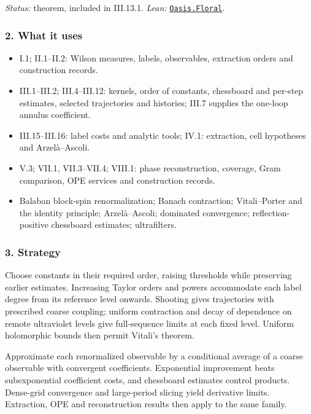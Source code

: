 \documentclass[
  letterpaper,
  11pt]{article}
\providecommand{\tightlist}{%
  \setlength{\itemsep}{0pt}\setlength{\parskip}{0pt}}
\begin{document}
\emph{Status:} theorem, included in III.13.1. \emph{Lean:}
\href{https://github.com/yang-mills-group/OpenAI-YM-20261028/blob/3456e5e75cf8d4cd558955a5c7638fba2d68f464/YM/UVExtension/Oasis/Flora.lean\#L55-L71}{\texttt{Oasis.Floral}}.

\subsubsection{2. What it uses}\label{what-it-uses-15}

\begin{itemize}
\tightlist
\item
  I.1; II.1--II.2: Wilson measures, labels, observables, extraction
  orders and construction records.
\item
  III.1--III.2; III.4--III.12: kernels, order of constants, chessboard
  and per-step estimates, selected trajectories and histories; III.7
  supplies the one-loop annulus coefficient.
\item
  III.15--III.16: label costs and analytic tools; IV.1: extraction, cell
  hypotheses and Arzelà--Ascoli.
\item
  V.3; VII.1, VII.3--VII.4; VIII.1: phase reconstruction, coverage, Gram
  comparison, OPE services and construction records.
\item
  Balaban block-spin renormalization; Banach contraction; Vitali--Porter
  and the identity principle; Arzelà--Ascoli; dominated convergence;
  reflection-positive chessboard estimates; ultrafilters.
\end{itemize}

\subsubsection{3. Strategy}\label{strategy-15}

Choose constants in their required order, raising thresholds while
preserving earlier estimates. Increasing Taylor orders and powers
accommodate each label degree from its reference level onwards. Shooting
gives trajectories with prescribed coarse coupling; uniform contraction
and decay of dependence on remote ultraviolet levels give full-sequence
limits at each fixed level. Uniform holomorphic bounds then permit
Vitali's theorem.

Approximate each renormalized observable by a conditional average of a
coarse observable with convergent coefficients. Exponential improvement
beats subexponential coefficient costs, and chessboard estimates control
products. Dense-grid convergence and large-period slicing yield
derivative limits. Extraction, OPE and reconstruction results then apply
to the same family.
\end{document}
